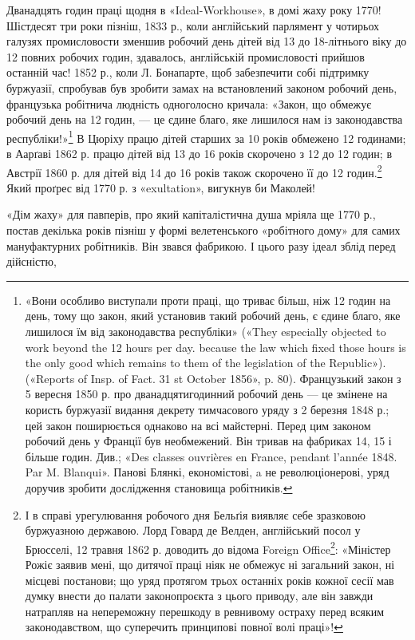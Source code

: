 Дванадцять годин праці щодня в «Ideal-Workhouse», в домі
жаху року 1770! Шістдесят три роки пізніш, 1833 р., коли англійський
парлямент у чотирьох галузях промисловости зменшив
робочий день дітей від 13 до 18-літнього віку до 12 повних робочих
годин, здавалось, англійській промисловості прийшов останній
час! 1852 р., коли Л. Бонапарте, щоб забезпечити собі підтримку
буржуазії, спробував був зробити замах на встановлений
законом робочий день, французька робітнича людність одноголосно
кричала: «Закон, що обмежує робочий день на 12 годин, —
це єдине благо, яке лишилося нам із законодавства республіки!»\footnote{
«Вони особливо виступали проти праці, що триває більш, ніж
12 годин на день, тому що закон, який установив такий робочий день, є
єдине благо, яке лишилося їм від законодавства республіки» («They especially
objected to work beyond the 12 hours per day. because the law which
fixed those hours is the only good which remains to them of the legislation
of the Republic»). («Reports of Insp. of Fact. 31 st October 1856»,
p. 80). Французький закон з 5 вересня 1850 р. про дванадцятигодинний
робочий день — це змінене на користь буржуазії видання декрету тимчасового
уряду з 2 березня 1848 р.; цей закон поширюється однаково на
всі майстерні. Перед цим законом робочий день у Франції був необмежений.
Він тривав на фабриках 14, 15 і більше годин. Див.; «Des classes
ouvrières en France, pendant l'année 1848. Par M. Blanqui». Панові Блянкі,
економістові, a не революціонерові, уряд доручив зробити дослідження
становища робітників.
}
В Цюріху працю дітей старших за 10 років обмежено 12 годинами;
в Аарґаві 1862 р. працю дітей від 13 до 16 років скорочено з 12
до 12 годин; в Австрії 1860 р. для дітей від 14 до 16 років також
скорочено її до 12 годин.\footnote{
І в справі урегулювання робочого дня Бельґія виявляє себе зразковою
буржуазною державою. Лорд Говард де Велден, англійський посол
у Брюсселі, 12 травня 1862 р. доводить до відома Foreign Office\footnote*{
— англійського міністерства закордонних справ. \emph{Ред.}
}: «Міністер
Рожіє заявив мені, що дитячої праці ніяк не обмежує ні загальний закон,
ні місцеві постанови; що уряд протягом трьох останніх років кожної сесії
мав думку внести до палати законопроєкта з цього приводу, але він завжди
натрапляв на непереможну перешкоду в ревнивому остраху перед
всяким законодавством, що суперечить принципові повної волі праці»!
} Який проґрес від 1770 р. з «exultation», вигукнув би Маколей!

«Дім жаху» для павперів, про який капіталістична душа
мріяла ще 1770 р., постав декілька років пізніш у формі велетенського
«робітного дому» для самих мануфактурних робітників.
Він звався фабрикою. І цього разу ідеал зблід перед дійсністю,

